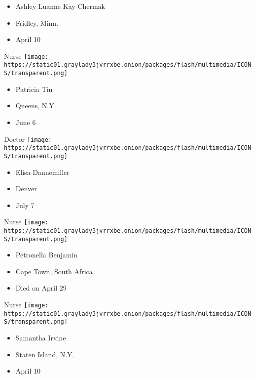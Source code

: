 \begin{itemize}
\tightlist
\item
  Ashley Luanne Kay Chermak
\item
  Fridley, Minn.
\item
  April 10
\end{itemize}

\protect\hyperlink{item-patricia-tiu}{}

Nurse
\texttt{[image: https://static01.graylady3jvrrxbe.onion/packages/flash/multimedia/ICONS/transparent.png]}

\begin{itemize}
\tightlist
\item
  Patricia Tiu
\item
  Queens, N.Y.
\item
  June 6
\end{itemize}

\protect\hyperlink{item-elisa-dannemiller}{}

Doctor
\texttt{[image: https://static01.graylady3jvrrxbe.onion/packages/flash/multimedia/ICONS/transparent.png]}

\begin{itemize}
\tightlist
\item
  Elisa Dannemiller
\item
  Denver
\item
  July 7
\end{itemize}

\protect\hyperlink{item-petronella-benjamin}{}

Nurse
\texttt{[image: https://static01.graylady3jvrrxbe.onion/packages/flash/multimedia/ICONS/transparent.png]}

\begin{itemize}
\tightlist
\item
  Petronella Benjamin
\item
  Cape Town, South Africa
\item
  Died on April 29
\end{itemize}

\protect\hyperlink{item-samantha-irvine}{}

Nurse
\texttt{[image: https://static01.graylady3jvrrxbe.onion/packages/flash/multimedia/ICONS/transparent.png]}

\begin{itemize}
\tightlist
\item
  Samantha Irvine
\item
  Staten Island, N.Y.
\item
  April 10
\end{itemize}

